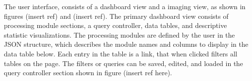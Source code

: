 The user interface, consists of a dashboard view and a imaging view, as shown in figures (insert ref) and (insert ref). The primary dashboard view consists of processing module sections, a query controller, data tables, and descriptive statistic visualizations. The processing modules are defined by the user in the JSON structure, which describes the module names and columns to display in the data table below. Each entry in the table is a link, that when clicked filters all tables on the page. The filters or queries can be saved, edited, and loaded in the query controller section shown in figure (insert ref here). 